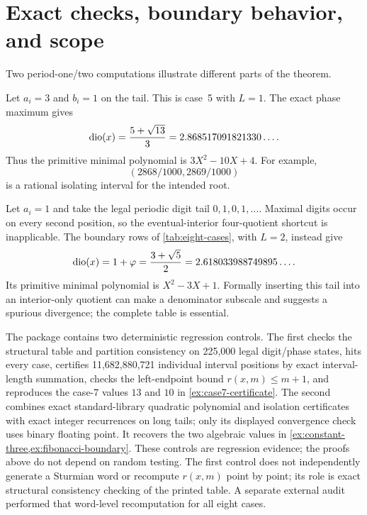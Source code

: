 \section{Exact checks, boundary behavior, and scope}
\label{sec:examples}

Two period-one/two computations illustrate different parts of the theorem.

\begin{example}
\label{ex:constant-three}
Let $a_i=3$ and $b_i=1$ on the tail.  This is case~5 with $L=1$.  The exact
phase maximum gives
\[
 \operatorname{dio}(x)=\frac{5+\sqrt{13}}{3}
          =2.868517091821330\ldots .
\]
Thus the primitive minimal polynomial is $3X^2-10X+4$.  For example,
\[
  (2868/1000,2869/1000)
\]
is a rational isolating interval for the intended root.
\end{example}

\begin{example}
\label{ex:fibonacci-boundary}
Let $a_i=1$ and take the legal periodic digit tail
$0,1,0,1,\ldots$.  Maximal digits occur on every second position, so the
eventual-interior four-quotient shortcut is inapplicable.  The boundary rows
of \cref{tab:eight-cases}, with $L=2$, instead give
\[
 \operatorname{dio}(x)=1+\varphi=\frac{3+\sqrt5}{2}
          =2.618033988749895\ldots .
\]
Its primitive minimal polynomial is $X^2-3X+1$.  Formally inserting this tail
into an interior-only quotient can make a denominator subscale and suggests a
spurious divergence; the complete table is essential.
\end{example}

The package contains two deterministic regression controls.  The first checks
the structural table and partition consistency on 225,000 legal digit/phase
states, hits every case, certifies
11,682,880,721 individual interval positions by exact interval-length
summation, checks the left-endpoint bound $r(x,m)\leq m+1$, and reproduces the
case-7 values $13$ and $10$ in \cref{ex:case7-certificate}.  The second combines
exact standard-library quadratic polynomial and isolation certificates with
exact integer recurrences on long tails; only its displayed convergence check
uses binary floating point.  It recovers the two algebraic values in
\cref{ex:constant-three,ex:fibonacci-boundary}.  These controls are
regression evidence; the proofs above do not depend on random testing.
The first control does not independently generate a Sturmian word or recompute
$r(x,m)$ point by point; its role is exact structural consistency checking of
the printed table.  A separate external audit performed that word-level
recomputation for all eight cases.

